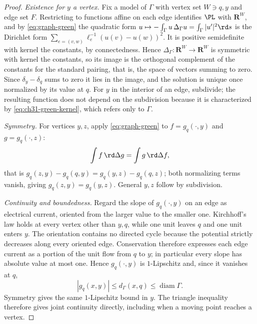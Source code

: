 \begin{proof}
\emph{Existence for $y$ a vertex.}  Fix a model of $\Gamma$ with vertex
set $W\ni q,y$ and edge set $F$.  Restricting to functions affine on
each edge identifies $\PL$ with $\mathbf R^W$, and by
\eqref{eq:graph-green} the quadratic form
$u\mapsto-\int_\Gamma u\,\Delta_\Gamma u=\int_\Gamma|u'|^2\rd s$ is the
Dirichlet form $\sum_{e=(v,w)}\ell_e^{-1}(u(v)-u(w))^2$.  It is positive
semidefinite with kernel the constants, by connectedness.  Hence
$\Delta_\Gamma:\mathbf R^W\to\mathbf R^W$ is symmetric with kernel the
constants, so its image is the orthogonal complement of the constants for
the standard pairing, that is, the space of vectors summing to zero.  Since
$\delta_y-\delta_q$ sums to zero it lies in the image, and the solution is
unique once normalized by its value at $q$.  For $y$ in the interior of
an edge, subdivide; the resulting function does not depend on the
subdivision because it is characterized by \eqref{eq:ch31-green-kernel},
which refers only to $\Gamma$.

\emph{Symmetry.}  For vertices $y,z$, apply \eqref{eq:graph-green} to
$f=g_q(\cdot,y)$ and $g=g_q(\cdot,z)$:
\[
 \int f\,\rd\Delta g=\int g\,\rd\Delta f,
\]
that is $g_q(z,y)-g_q(q,y)=g_q(y,z)-g_q(q,z)$; both normalizing terms
vanish, giving $g_q(z,y)=g_q(y,z)$.  General $y,z$ follow by
subdivision.

\emph{Continuity and boundedness.}  Regard the slope of
$g_q(\cdot,y)$ on an edge as electrical current, oriented from the larger
value to the smaller one.  Kirchhoff's law holds at every vertex other than
$y,q$, while one unit leaves $q$ and one unit enters $y$.  The
orientation contains no directed cycle because the potential strictly
decreases along every oriented edge.  Conservation therefore expresses
each edge current as a portion of the unit flow from $q$ to $y$; in
particular every slope has absolute value at most one.  Hence
$g_q(\cdot,y)$ is $1$-Lipschitz and, since it vanishes at $q$,
\[
                 |g_q(x,y)|\leq d_\Gamma(x,q)
                    \leq\operatorname{diam}\Gamma .
\]
Symmetry gives the same $1$-Lipschitz bound in $y$.  The triangle
inequality therefore gives joint continuity directly, including when a
moving point reaches a vertex.


\end{proof}
